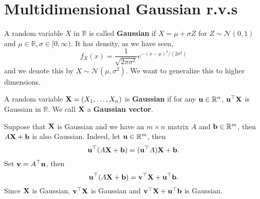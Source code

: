 \section{Multidimensional Gaussian r.v.s}
\begin{definition}
    A random variable $X$ in $\mathbb R$ is called \textbf{Gaussian} if $X=\mu+\sigma Z$ for $Z\sim\mathcal N(0,1)$ and $ \mu\in \mathbb{R}, \sigma\in [0,\infty) $.
    It has density, as we have seen,
    $$f_X(x)=\frac{1}{\sqrt{2\pi\sigma^2}}e^{-(x-\mu)^2/(2\sigma^2)}$$
    and we denote this by $X\sim\mathcal N(\mu,\sigma^2)$.
    We want to generalize this to higher dimensions.
\end{definition}
\begin{definition}
    A random variable ${\bf X}=(X_1,\ldots,X_n)$ is \textbf{Gaussian} if for any ${\bf u}\in\mathbb R^n$, ${\bf u}^\top {\bf X}$ is Gaussian in $\mathbb R$.
    We call ${\bf X}$ a \textbf{Gaussian vector}.
\end{definition}

\begin{example}
    Suppose that $ {\bf X} $ is Gaussian and we have an $m\times n$ matrix $A$ and ${\bf b}\in\mathbb R^m$, then $A{\bf X}+{\bf b}$ is also Gaussian. Indeed, let $ {\bf u}\in \mathbb{R}^{m} $, then 
    \[
        {\bf u}^\top (A{\bf X}+{\bf b}) = ({\bf u}^\top A){\bf X}+{\bf b}.
    \]
    Set $ {\bf v} = A^\top {\bf u} $, then 
    \[
        {\bf u}^\top (A{\bf X}+{\bf b}) = {\bf v}^\top {\bf X} + {\bf u}^\top {\bf b}.
    \]
    Since ${\bf X}$ is Gaussian, $ {\bf v}^\top {\bf X} $ is Gaussian and $ {\bf v}^\top {\bf X} + {\bf u}^\top {\bf b} $ is Gaussian.
\end{example}